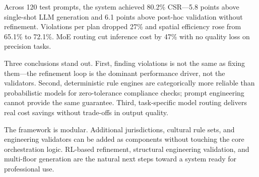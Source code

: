 \documentclass[journal]{IEEEtran}
\begin{document}
Across 120 test prompts, the system achieved 80.2\% CSR---5.8 points above
single-shot LLM generation and 6.1 points above post-hoc validation without
refinement. Violations per plan dropped 27\% and spatial efficiency rose from
65.1\% to 72.1\%. MoE routing cut inference cost by 47\% with no quality loss
on precision tasks.

Three conclusions stand out. First, finding violations is not the same as
fixing them---the refinement loop is the dominant performance driver, not the
validators. Second, deterministic rule engines are categorically more reliable
than probabilistic models for zero-tolerance compliance checks; prompt
engineering cannot provide the same guarantee. Third, task-specific model
routing delivers real cost savings without trade-offs in output quality.

The framework is modular. Additional jurisdictions, cultural rule sets, and
engineering validators can be added as components without touching the core
orchestration logic. RL-based refinement, structural engineering validation,
and multi-floor generation are the natural next steps toward a system ready
for professional use.

\end{document}
